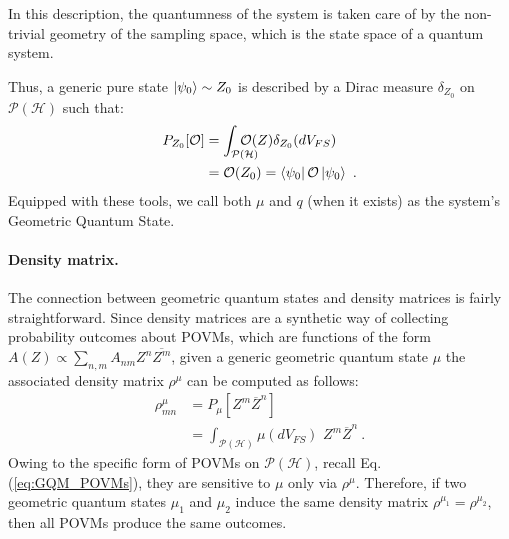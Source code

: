 \documentclass[%
 reprint,
 superscriptaddress,
 aps,
 pra,
]{revtex4-2}
\newcommand{\intP}{\int_{\mathcal{P}(\mathcal{H})} \!\!\!\!\!\!\!\!\!}
\newcommand{\PH}{\mathcal{P}(\mathcal{H})}
\theoremstyle{definition}
\begin{document}
In this description, the quantumness of the system is taken care of by the non-trivial 
geometry of the sampling space, which is the state 
space of a quantum system.


Thus, a generic pure state $\ket{\psi_0} \sim Z_0$ is described by a Dirac measure 
 $\delta_{Z_0}$ on $\PH$ such that:
\begin{align*}
P_{Z_0}[\mathcal{O}] &= \intP \mathcal{O}(Z) \delta_{Z_0}(dV_{FS}) \\
  & = \mathcal{O}(Z_0)  = \bra{\psi_0}\mathcal{O}\ket{\psi_0}
  ~.
\end{align*}
Equipped with these tools, we call both $\mu$ and $q$ (when it exists) as the system's
Geometric Quantum State.  


\paragraph*{Density matrix.}
The connection between geometric quantum states and density matrices is
fairly straightforward. Since density matrices are a synthetic way of collecting
probability outcomes about POVMs, which are functions of the 
form $A(Z) \propto \sum_{n,m}A_{n m} Z^n \overline{Z^m}$, 
given a generic geometric quantum state $\mu$ the associated density matrix $\rho^\mu$ can be 
computed as follows:
\begin{align}
\rho^\mu_{mn} & = P_\mu[Z^m \overline{Z}^n] \nonumber \\
  & = \intP \mu(dV_{FS}) \,   \, Z^m \overline{Z}^n
  ~.
\label{eq:densitymatrix}
\end{align}
Owing to the specific form of POVMs on $\mathcal{P}(\mathcal{H})$, recall Eq. (\ref{eq:GQM_POVMs}), they
are sensitive to $\mu$ only via $\rho^\mu$. Therefore, if two geometric quantum states 
$\mu_1$ and $\mu_2$ induce the same density matrix $\rho^{\mu_1} = \rho^{\mu_2}$, then all POVMs
produce the same outcomes.
\end{document}
